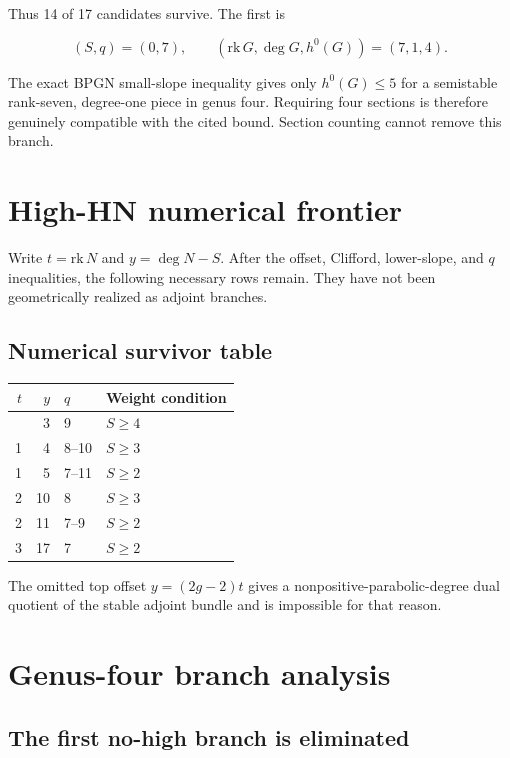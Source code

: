 \documentclass[11pt]{article}
\theoremstyle{definition}
\begin{document}
Thus 14 of 17 candidates survive. The first is

\[(S,q)=(0,7),
\qquad
(\mathrm{rk}\,G,\deg G,h^0(G))=(7,1,4).\]

The exact BPGN small-slope inequality gives only \(h^0(G)\le5\) for a
semistable rank-seven, degree-one piece in genus four. Requiring four
sections is therefore genuinely compatible with the cited bound. Section
counting cannot remove this branch.

\section{High-HN numerical frontier}\label{high-hn-numerical-frontier}

Write \(t=\mathrm{rk}\,N\) and \(y=\deg N-S\). After the offset,
Clifford, lower-slope, and \(q\) inequalities, the following necessary
rows remain. They have not been geometrically realized as adjoint
branches.

\subsection{Numerical survivor table}\label{genus-four-1}

\begin{longtable}[]{@{}rrll@{}}
\toprule\noalign{}
\(t\) & \(y\) & \(q\) & Weight condition \\
\midrule\noalign{}
\endhead
\bottomrule\noalign{}
\endlastfoot
1 & 3 & 9 & \(S\ge4\) \\
1 & 4 & 8--10 & \(S\ge3\) \\
1 & 5 & 7--11 & \(S\ge2\) \\
2 & 10 & 8 & \(S\ge3\) \\
2 & 11 & 7--9 & \(S\ge2\) \\
3 & 17 & 7 & \(S\ge2\) \\
\end{longtable}

The omitted top offset \(y=(2g-2)t\) gives a
nonpositive-parabolic-degree dual quotient of the stable adjoint bundle
and is impossible for that reason.

\section{Genus-four branch analysis}\label{genus-four-branch-analysis}

\subsection{The first no-high branch is
eliminated}\label{the-first-no-high-branch-is-eliminated}
\end{document}
